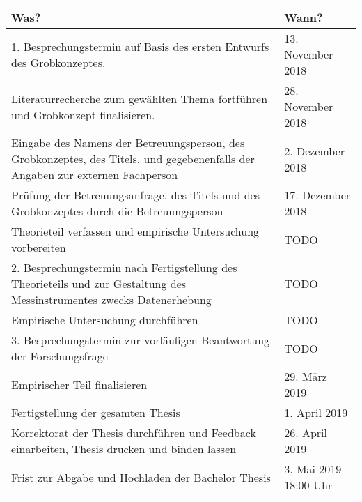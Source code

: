 \documentclass[12pt, twoside, table]{extarticle}
\begin{document}
 
\begin{center}
    \renewcommand{\arraystretch}{1.25}
    \setlength{\tabcolsep}{15pt}
    \begin{tabular}{ | p{8cm} | l |}
    \hline
    \rowcolor{ccc} Was? & Wann? \\ \hline
    1. Besprechungstermin auf Basis des ersten Entwurfs des Grobkonzeptes. & 13. November 2018 \\ \hline
    
    Literaturrecherche zum gewählten Thema fortführen und Grobkonzept finalisieren. & 28. November 2018 \\ \hline
    
    \rowcolor{orange} Eingabe des Namens der Betreuungsperson, des Grobkonzeptes, des Titels, und gegebenenfalls der Angaben zur externen Fachperson & 2. Dezember 2018 \\ \hline
    
    Prüfung der Betreuungsanfrage, des Titels und des Grobkonzeptes durch die Betreuungsperson & 17. Dezember 2018 \\ \hline
    
    Theorieteil verfassen und empirische Untersuchung vorbereiten & TODO \\ \hline
    
    2. Besprechungstermin nach Fertigstellung des Theorieteils und zur Gestaltung des Messinstrumentes zwecks Datenerhebung & TODO \\ \hline
    
    Empirische Untersuchung durchführen & TODO \\ \hline
    
    3. Besprechungstermin zur vorläufigen Beantwortung der Forschungsfrage & TODO \\ \hline
    
    Empirischer Teil finalisieren & 29. März 2019 \\ \hline
    
    Fertigstellung der gesamten Thesis & 1. April 2019 \\ \hline
    
    Korrektorat der Thesis durchführen und Feedback einarbeiten, Thesis drucken und binden lassen & 26. April 2019 \\ \hline
    
    \rowcolor{orange} Frist zur Abgabe und Hochladen der Bachelor Thesis & 3. Mai 2019 18:00 Uhr \\ \hline
    
    \end{tabular}
\end{center}
\end{document}

